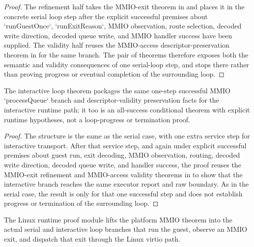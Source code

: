 \begin{proof}
\leanok
{}
The refinement half takes the MMIO-exit theorem in  and places it in the concrete serial loop step after the explicit successful premises about `runGuestOnce`, `runExitReason`, MMIO observation, route selection, decoded write direction, decoded queue write, and MMIO handler success have been supplied.
The validity half reuses the MMIO-access descriptor-preservation theorem in  for the same branch.
The pair of theorems therefore exposes both the semantic and validity consequences of one serial-loop step, and stops there rather than proving progress or eventual completion of the surrounding loop.
\end{proof}

\begin{theorem}
\label{thm:linux-interactive-runtime}
\leanok
The interactive loop theorem packages the same one-step successful MMIO `processQueue` branch and descriptor-validity preservation facts for the interactive runtime path; it too is an all-success conditional theorem with explicit runtime hypotheses, not a loop-progress or termination proof.
\end{theorem}

\begin{proof}
\leanok
{}
The structure is the same as the serial case, with one extra service step for interactive transport.
After that service step, and again under explicit successful premises about guest run, exit decoding, MMIO observation, routing, decoded write direction, decoded queue write, and handler success, the proof reuses the MMIO-exit refinement and MMIO-access validity theorems in  to show that the interactive branch reaches the same executor report and raw boundary.
As in the serial case, the result is only for that one successful step and does not establish progress or termination of the surrounding loop.
\end{proof}

\begin{theorem}
\label{thm:linux-runtime-internals}
\leanok
The Linux runtime proof module lifts the platform MMIO theorem into the actual serial and interactive loop branches that run the guest, observe an MMIO exit, and dispatch that exit through the Linux virtio path.
\end{theorem}

